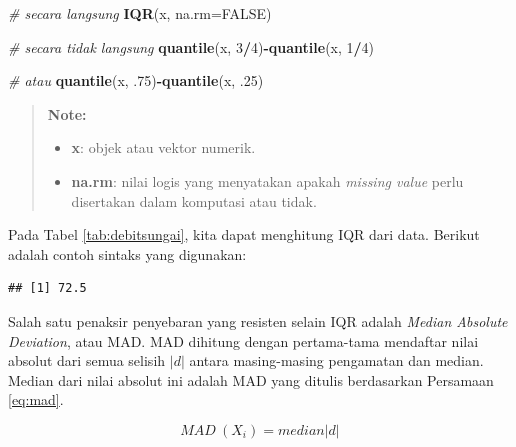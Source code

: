 \documentclass[]{book}
\newenvironment{Shaded}{\begin{snugshade}}{\end{snugshade}}
\newcommand{\KeywordTok}[1]{\textcolor[rgb]{0.13,0.29,0.53}{\textbf{#1}}}
\newcommand{\DataTypeTok}[1]{\textcolor[rgb]{0.13,0.29,0.53}{#1}}
\newcommand{\DecValTok}[1]{\textcolor[rgb]{0.00,0.00,0.81}{#1}}
\newcommand{\CommentTok}[1]{\textcolor[rgb]{0.56,0.35,0.01}{\textit{#1}}}
\newcommand{\OtherTok}[1]{\textcolor[rgb]{0.56,0.35,0.01}{#1}}
\newcommand{\OperatorTok}[1]{\textcolor[rgb]{0.81,0.36,0.00}{\textbf{#1}}}
\newcommand{\NormalTok}[1]{#1}
\providecommand{\tightlist}{%
  \setlength{\itemsep}{0pt}\setlength{\parskip}{0pt}}
\begin{document}
\begin{Shaded}
\begin{Highlighting}[]
\CommentTok{# secara langsung}
\KeywordTok{IQR}\NormalTok{(x, }\DataTypeTok{na.rm=}\OtherTok{FALSE}\NormalTok{)}

\CommentTok{# secara tidak langsung}
\KeywordTok{quantile}\NormalTok{(x, }\DecValTok{3}\OperatorTok{/}\DecValTok{4}\NormalTok{)}\OperatorTok{-}\KeywordTok{quantile}\NormalTok{(x, }\DecValTok{1}\OperatorTok{/}\DecValTok{4}\NormalTok{)}

\CommentTok{# atau}
\KeywordTok{quantile}\NormalTok{(x, .}\DecValTok{75}\NormalTok{)}\OperatorTok{-}\KeywordTok{quantile}\NormalTok{(x, .}\DecValTok{25}\NormalTok{)}
\end{Highlighting}
\end{Shaded}

\begin{quote}
\textbf{Note:}

\begin{itemize}
\tightlist
\item
  \textbf{x}: objek atau vektor numerik.
\item
  \textbf{na.rm}: nilai logis yang menyatakan apakah \emph{missing
  value} perlu disertakan dalam komputasi atau tidak.
\end{itemize}
\end{quote}

Pada Tabel \ref{tab:debitsungai}, kita dapat menghitung IQR dari data.
Berikut adalah contoh sintaks yang digunakan:

\begin{Shaded}
\end{Shaded}

\begin{verbatim}
## [1] 72.5
\end{verbatim}

Salah satu penaksir penyebaran yang resisten selain IQR adalah
\emph{Median Absolute Deviation}, atau MAD. MAD dihitung dengan
pertama-tama mendaftar nilai absolut dari semua selisih \(|d|\) antara
masing-masing pengamatan dan median. Median dari nilai absolut ini
adalah MAD yang ditulis berdasarkan Persamaan \eqref{eq:mad}.

\begin{equation}
  MAD\ \left(X_i\right)=median\left|d\right|
  \label{eq:mad}
\end{equation}
\end{document}
